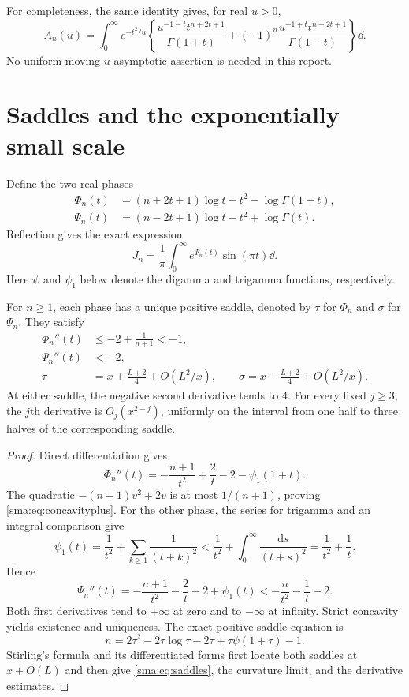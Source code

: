 \documentclass[11pt,letterpaper]{article}
\numberwithin{equation}{section}
\begin{document}
For completeness, the same identity gives, for real $u>0$,
\begin{equation}\label{sma:eq:uidentity}
 A_n(u)=\int_0^\infty e^{-t^2/u}\left\{
 \frac{u^{-1-t}t^{n+2t+1}}{\Gamma(1+t)}
 +(-1)^n\frac{u^{-1+t}t^{n-2t+1}}{\Gamma(1-t)}\right\}\dd.
\end{equation}
No uniform moving-$u$ asymptotic assertion is needed in this report.

\section{Saddles and the exponentially small scale}
Define the two real phases
\begin{align}
 \Phi_n(t)&=(n+2t+1)\log t-t^2-\log\Gamma(1+t),\label{sma:eq:phi}\\
 \Psi_n(t)&=(n-2t+1)\log t-t^2+\log\Gamma(t).\label{sma:eq:psi}
\end{align}
Reflection gives the exact expression
\begin{equation}\label{sma:eq:reflection}
 J_n=\frac1\pi\int_0^\infty e^{\Psi_n(t)}\sin(\pi t)\dd.
\end{equation}
Here $\psi$ and $\psi_1$ below denote the digamma and trigamma functions, respectively.

\begin{lemma}\label{sma:lem:concavity}
For $n\ge1$, each phase has a unique positive saddle, denoted by $\tau$ for $\Phi_n$ and $\sigma$ for $\Psi_n$. They satisfy
\begin{align}
 \Phi_n''(t)&\le -2+\frac1{n+1}<-1,\label{sma:eq:concavityplus}\\
 \Psi_n''(t)&<-2,\label{sma:eq:concavityminus}\\
 \tau&=x+\frac{L+2}{4}+O(L^2/x),\qquad
 \sigma=x-\frac{L+2}{4}+O(L^2/x).\label{sma:eq:saddles}
\end{align}
At either saddle, the negative second derivative tends to $4$. For every fixed $j\ge3$, the $j$th derivative is $O_j(x^{2-j})$, uniformly on the interval from one half to three halves of the corresponding saddle.
\end{lemma}
\begin{proof}
Direct differentiation gives
\[
 \Phi_n''(t)=-\frac{n+1}{t^2}+\frac2t-2-\psi_1(1+t).
\]
The quadratic $-(n+1)v^2+2v$ is at most $1/(n+1)$, proving \eqref{sma:eq:concavityplus}. For the other phase, the series for trigamma and an integral comparison give
\[
 \psi_1(t)=\frac1{t^2}+\sum_{k\ge1}\frac1{(t+k)^2}
 <\frac1{t^2}+\int_0^\infty\frac{\mathrm ds}{(t+s)^2}
 =\frac1{t^2}+\frac1t.
\]
Hence
\[
 \Psi_n''(t)=-\frac{n+1}{t^2}-\frac2t-2+\psi_1(t)
 <-\frac n{t^2}-\frac1t-2.
\]
Both first derivatives tend to $+\infty$ at zero and to $-\infty$ at infinity. Strict concavity yields existence and uniqueness. The exact positive saddle equation is
\begin{equation}\label{sma:eq:tau}
 n=2\tau^2-2\tau\log\tau-2\tau+\tau\psi(1+\tau)-1.
\end{equation}
Stirling's formula and its differentiated forms first locate both saddles at $x+O(L)$ and then give \eqref{sma:eq:saddles}, the curvature limit, and the derivative estimates.
\end{proof}
\end{document}
